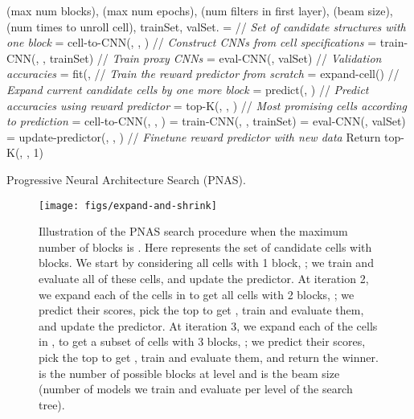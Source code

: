 \documentclass[runningheads]{llncs}
\begin{document}
\begin{algorithm}[t]
\begin{algorithmic}
 (max num blocks),
 (max num epochs),
 (num filters in first layer),
 (beam size),
 (num times to unroll cell),
trainSet,
valSet.
\STATE  =  // {\it Set of candidate structures with one block}
\STATE  = cell-to-CNN(, , ) // {\it Construct CNNs from cell specifications}
\STATE  = train-CNN(, , trainSet) //  {\it Train proxy CNNs}
\STATE  = eval-CNN(, valSet) //  {\it Validation accuracies}
\STATE  = fit(,  // {\it Train the reward predictor from scratch}
\FOR{}
\STATE  = expand-cell() // {\it Expand current candidate cells by one more block}
\STATE  = predict(, ) // {\it Predict accuracies using reward predictor}
\STATE  = top-K(, , ) // {\it Most promising cells according to prediction}
\STATE  = cell-to-CNN(, , )
\STATE  = train-CNN(, , trainSet) 
\STATE  = eval-CNN(, valSet) 
\STATE  = update-predictor(, , ) // {\it Finetune reward predictor with new data}
\ENDFOR
\STATE Return top-K(, , 1) 
\end{algorithmic}
\caption{Progressive Neural Architecture Search (PNAS).
}
\label{alg:pnas}
\end{algorithm}


\begin{figure}[t]
    \centering
    \begin{minipage}[c]{0.49\textwidth}
    \texttt{[image: figs/expand-and-shrink]}
    \end{minipage} \hfill
    \begin{minipage}[c]{0.5\textwidth}
    \caption{Illustration of the PNAS search procedure when the maximum number of blocks is .
    Here  represents the set of candidate cells with  blocks.
    We start by considering all cells with 1 block, ;
    we train and evaluate all of these cells, and update the predictor.
    At iteration 2, we expand each of the cells in  
    to get all cells with 2 blocks, ;
    we predict their scores, pick the top  to get ,
    train and evaluate them, and update the predictor.
    At iteration 3, we expand each of the cells in ,  to get a subset of cells with 3 blocks,
    ;
     we predict their scores, pick the top  to get , train and evaluate them,
     and return the winner.
  is the number of possible blocks at level 
    and  is the beam size (number of models we
    train and evaluate per level of the search tree).
    }
    \label{fig:PNAStree}
    \end{minipage}
\end{figure}
\end{document}

